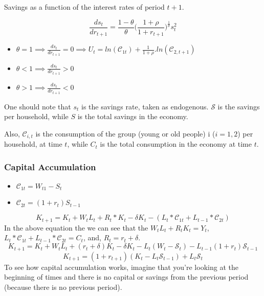 Savings as a function of the interest rates of period $t+1$.

\begin{equation*}
    \frac{d s_{t}}{d r_{t+1}}=\frac{1-\theta}{\theta}\bigg(\frac{1+\rho}{1+r_{t+1}} \bigg)^\frac{1}{\theta}s_{t}^2
\end{equation*}

\begin{itemize}
    \item $\theta=1 \implies \frac{ds_{t}}{d r_{t+1}}=0 \implies U_{t}=ln(\mathcal{C}_{1t})+\frac{1}{1+\rho}.ln(\mathcal{C}_{2,t+1})$
    \item $\theta < 1 \implies \frac{ds_{t}}{dr_{t+1}}>0$
    \item $\theta > 1 \implies \frac{ds_{t}}{dr_{t+1}}<0$
\end{itemize}

One should note that $s_{t}$ is the savings rate, taken as endogenous. $\mathcal{S}$ is the savings per household, while $S$ is the total savings in the economy.

Also, $\mathcal{C}_{i,t}$ is the consumption of the group (young or old people) i ($i=1,2$) per household, at time $t$, while $C_{t}$ is the total consumption in the economy at time $t$.

\subsubsection{Capital Accumulation}
\begin{itemize}
    \item $\mathcal{C}_{1t}=W_{t1}-S_{t}$
    \item $\mathcal{C}_{2t}=(1+r_{t})S_{t-1}$
\end{itemize}
\begin{equation}
    K_{t+1} = K_t + W_t  L_t + R_t * K_t - \delta K_t -(L_t*\mathcal{C}_{1t} + L_{t-1}*\mathcal{C}_{2t})
\end{equation}
In the above equation the we can see that the $W_tL_t+R_tK_t=Y_t$, $L_t*\mathcal{C}_{1t} + L_{t-1}*\mathcal{C}_{2t}=C_{t}$, and, $R_{t}=r_{t}+\delta$.
\begin{equation*}
    K_{t+1}=K_{t}+W_{t}L_{t}+(r_{t}+\delta)K_{t}-\delta K_{t}-L_{t}(W_{t}-\mathcal{S}_{t})-L_{t-1}(1+r_{t})\mathcal{S}_{t-1}
\end{equation*}
\begin{equation*}
    K_{t+1}=(1+r_{t+1})(K_{t}-L_{t}\mathcal{S}_{t-1})+L_{t}\mathcal{S}_{t}
\end{equation*}
To see how capital accumulation works, imagine that you're looking at the beginning of times and there is no capital or savings from the previous period (because there is no previous period).

